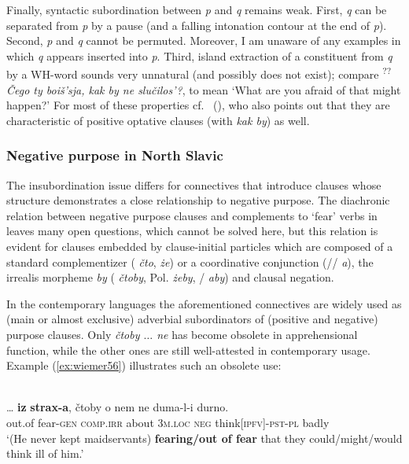 \documentclass[output=paper,colorlinks,citecolor=brown]{langscibook}
\begin{document}
Finally, syntactic subordination between \textit{p} and \textit{q} remains weak. First, \textit{q} can be separated from \textit{p} by a pause (and a falling intonation contour at the end of \textit{p}). Second, \textit{p} and \textit{q} cannot be permuted. Moreover, I am unaware of any examples in which \textit{q} appears inserted into \textit{p}. Third, island extraction of a constituent from \textit{q} by a WH-word sounds very unnatural (and possibly does not exist); compare  \textsuperscript{??}\textit{Čego ty boiš'sja, kak by ne slučilos'?}, to mean `What are you afraid of that might happen?' For most of these properties cf.\ \citeauthor{Dobrushina2016} (\citeyear[344--345]{Dobrushina2016}), who also points out that they are characteristic of positive optative clauses (with \textit{kak by}) as well.



\subsubsection{Negative purpose in North Slavic}
\label{subsubsec:negpurpose}


\noindent The insubordination issue differs for connectives that introduce clauses whose structure demonstrates a close relationship to negative purpose. The diachronic relation between negative purpose clauses and complements to `fear' verbs in  leaves many open questions, which cannot be solved here, but this relation is evident for clauses embedded by clause-initial particles which are composed of a standard complementizer ( \textit{čto},  \textit{że}) or a coordinative conjunction (// \textit{a}), the irrealis morpheme \textit{by} ( \textit{čtoby}, Pol. \textit{żeby}, / \textit{aby}) and clausal negation.

In the contemporary languages the aforementioned connectives are widely used as (main or almost exclusive) adverbial subordinators of (positive and negative) purpose clauses. Only  \textit{čtoby $\ldots$ ne} has become obsolete in apprehensional function, while the other ones are still well{}-attested in contemporary usage. Example (\ref{ex:wiemer56}) illustrates such an obsolete use:

\ea 
\label{ex:wiemer56} 
 \\
\gll \ldots{} \textbf{iz} \textbf{strax-a}, čtoby o nem ne duma-l-i durno. \\
{} out.of fear-\textsc{gen} \textsc{comp.irr} about \textsc{3m.loc} \textsc{neg} think\textsc{[ipfv]-pst-pl} badly \\
\glt `(He never kept maidservants) \textbf{fearing/out of fear} that they could/might/would think ill of him.' \\
\z
\end{document}
